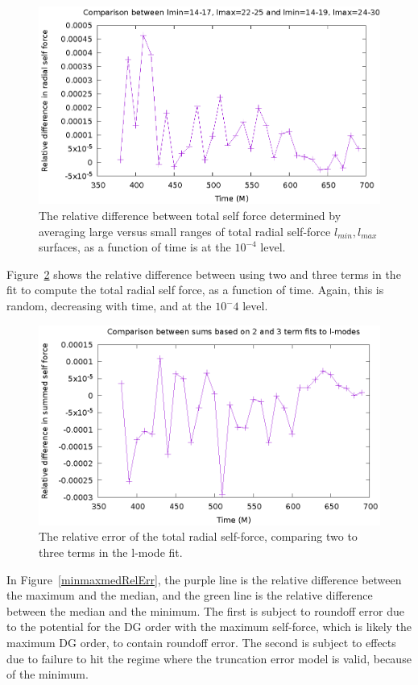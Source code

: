 \begin{figure}
  \includegraphics{relErrBigSmallRangeOverTime.eps}
  \caption{The relative difference between total self force determined by averaging large versus small ranges of total radial self-force $l_{min},l_{max}$ surfaces, as a function of time is at the $10^{-4}$ level.}
  \label{relErrSelfForceBigSmall}
\end{figure}


Figure~\ref{relErr23terms} shows the relative difference between using two and three terms in the fit to compute the total radial self force, as a function of time. Again, this is random, decreasing with time, and at the $10^-4$ level. 


\begin{figure}
  \includegraphics{relativeError23termSelfForce.eps}
  \caption{The relative error of the total radial self-force, comparing two to three terms in the l-mode fit.}
  \label{relErr23terms}
\end{figure}

In Figure~\ref{minmaxmedRelErr}, the purple line is the relative difference between the maximum and the median, and the green line is the relative difference between the median and the minimum. The first is subject to roundoff error due to the potential for the DG order with the maximum self-force, which is likely the maximum DG order, to contain roundoff error. The second is subject to effects due to failure to hit the regime where the truncation error model is valid, because of the minimum.

